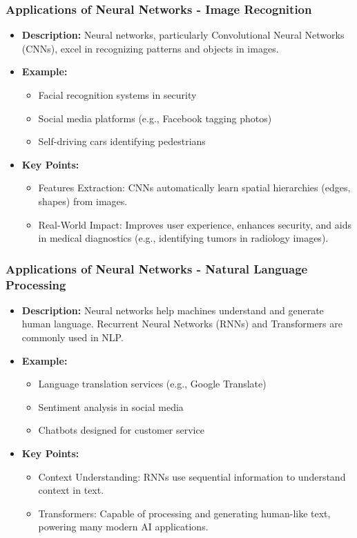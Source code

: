 \documentclass[aspectratio=169]{beamer}
\begin{document}
\begin{frame}[fragile]
    \frametitle{Applications of Neural Networks - Image Recognition}
    \begin{itemize}
        \item \textbf{Description:} Neural networks, particularly Convolutional Neural Networks (CNNs), excel in recognizing patterns and objects in images.
        \item \textbf{Example:} 
            \begin{itemize}
                \item Facial recognition systems in security
                \item Social media platforms (e.g., Facebook tagging photos)
                \item Self-driving cars identifying pedestrians
            \end{itemize}
        \item \textbf{Key Points:}
            \begin{itemize}
                \item Features Extraction: CNNs automatically learn spatial hierarchies (edges, shapes) from images.
                \item Real-World Impact: Improves user experience, enhances security, and aids in medical diagnostics (e.g., identifying tumors in radiology images).
            \end{itemize}
    \end{itemize}
\end{frame}

\begin{frame}[fragile]
    \frametitle{Applications of Neural Networks - Natural Language Processing}
    \begin{itemize}
        \item \textbf{Description:} Neural networks help machines understand and generate human language. Recurrent Neural Networks (RNNs) and Transformers are commonly used in NLP.
        \item \textbf{Example:}
            \begin{itemize}
                \item Language translation services (e.g., Google Translate)
                \item Sentiment analysis in social media
                \item Chatbots designed for customer service
            \end{itemize}
        \item \textbf{Key Points:}
            \begin{itemize}
                \item Context Understanding: RNNs use sequential information to understand context in text.
                \item Transformers: Capable of processing and generating human-like text, powering many modern AI applications.
            \end{itemize}
    \end{itemize}
\end{frame}
\end{document}
